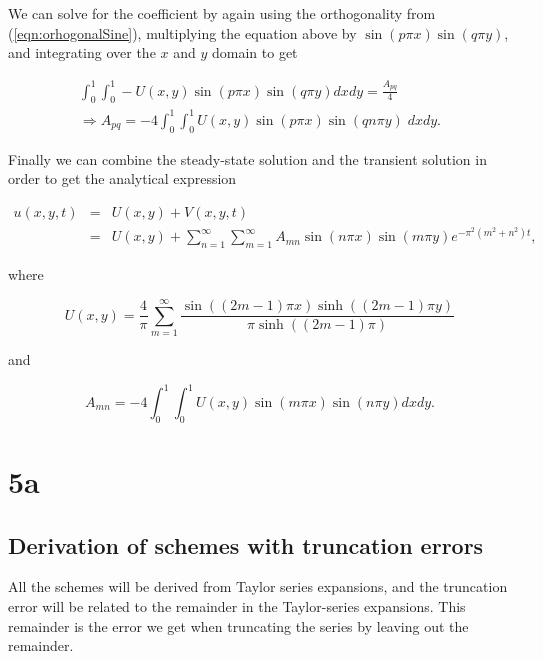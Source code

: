 \documentclass{article}
\begin{document}
We can solve for the coefficient by again using the orthogonality from (\ref{eqn:orhogonalSine}), multiplying the equation above by $ \sin(p\pi x) \sin(q\pi y)$, and integrating over the $x$ and $y$ domain to get

\begin{subequations}
	\begin{eqnarray}
	\int_0^1 \int_0^1 -U(x,y) \sin(p\pi x)\sin(q\pi y) dxdy =  \frac{A_{pq}}{4}\\
	\Rightarrow A_{pq} = -4 \int_0^1 \int_0^1 U(x,y) \sin(p\pi x)\sin(qn\pi y)\; dxdy.
	\end{eqnarray}
\end{subequations}

Finally we can combine the steady-state solution and the transient solution in order to get the analytical expression

\begin{eqnarray}
u(x,y,t) &=& U(x,y) + V(x,y,t)\\ \nonumber
&=& U(x,y) + \sum_{n=1}^{\infty} \sum_{m=1}^{\infty} A_{mn}\sin(n\pi x)\sin(m\pi y)e^{-\pi^2(m^2+n^2)t},
\end{eqnarray}

where

\begin{equation}
U(x,y) = \frac{4}{\pi} \sum_{m=1}^{\infty} \frac{\sin((2m-1)\pi x)\sinh((2m-1)\pi y)}{\pi \sinh((2m-1)\pi)}
\end{equation}

and 

\begin{equation}
A_{mn} = -4 \int_0^1 \int_0^1 U(x,y) \sin(m\pi x)\sin(n\pi y) dxdy.
\end{equation}



\section{5a}

\subsection{Derivation of schemes with truncation errors}
All the schemes will be derived from Taylor series expansions, and the truncation error will be related to the remainder in the Taylor-series expansions. This remainder is the error we get when truncating the series by leaving out the remainder.\\
\end{document}
